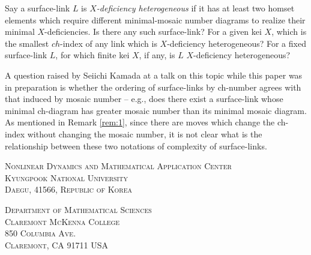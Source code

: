\documentclass{article}
\theoremstyle{definition}
\begin{document}
Say a surface-link $L$ is \textit{$X$-deficiency heterogeneous} if it has at 
least two homset elements which require different minimal-mosaic number 
diagrams to realize their minimal $X$-deficiencies. Is there any such 
surface-link? For a given kei $X$, which is the smallest $ch$-index of
any link which is $X$-deficiency heterogeneous? For a fixed surface-link
$L$, for which finite kei $X$, if any, is $L$ $X$-deficiency heterogeneous?

A question raised by Seiichi Kamada at a talk on this topic while this
paper was in preparation is whether the ordering of surface-links
by ch-number agrees with that induced by mosaic number -- e.g.,
does there exist a surface-link whose minimal ch-diagram has greater
mosaic number than its minimal mosaic diagram. As mentioned in Remark 
\ref{rem:1}, since there are moves which change the ch-index without changing 
the mosaic number, it is not clear what is the relationship between these two
notations of complexity of surface-links.


{}



\bigskip

\noindent
\textsc{Nonlinear Dynamics and Mathematical Application Center \\
Kyungpook National University \\
Daegu, 41566, Republic of Korea} 

\bigskip

\noindent
\textsc{Department of Mathematical Sciences \\
Claremont McKenna College \\
850 Columbia Ave. \\
Claremont, CA 91711 USA} 
\end{document}
